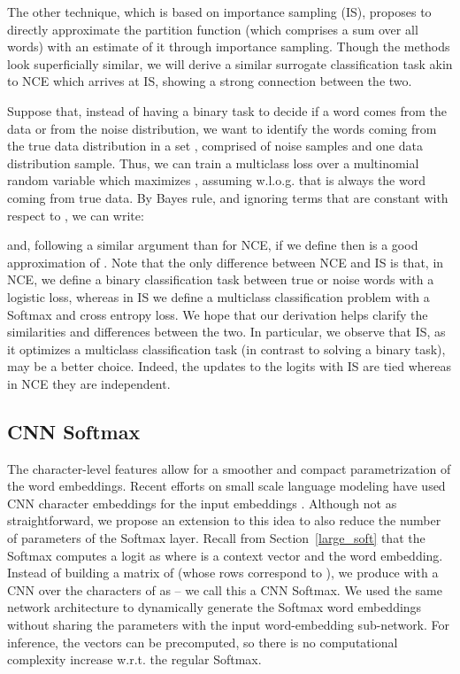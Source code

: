 \documentclass{article}
\begin{document}
The other technique, which is based on importance sampling (IS), proposes to directly approximate the partition function (which comprises a sum over all words) with an estimate of it through importance sampling. Though the methods look superficially similar, we will derive a similar surrogate classification task akin to NCE which arrives at IS, showing a strong connection between the two.

Suppose that, instead of having a binary task to decide if a word comes from the data or from the noise distribution, we want to identify the words coming from the true data distribution in a set , comprised of  noise samples and one data distribution sample. Thus, we can train a multiclass loss over a multinomial random variable  which maximizes , assuming w.l.o.g. that  is always the word coming from true data. By Bayes rule, and ignoring terms that are constant with respect to , we can write:


and, following a similar argument than for NCE, if we define  then  is a good approximation of . Note that the only difference between NCE and IS is that, in NCE, we define a binary classification task between true or noise words with a logistic loss, whereas in IS we define a multiclass classification problem with a Softmax and cross entropy loss. We hope that our derivation helps clarify the similarities and differences between the two. In particular, we observe that IS, as it optimizes a multiclass classification task (in contrast to solving a binary task), may be a better choice. Indeed, the updates to the logits with IS are tied whereas in NCE they are independent.

\subsection{CNN Softmax}
\label{cnn_softmax}

The character-level features allow for a smoother and compact parametrization of the word embeddings. Recent efforts on small scale language modeling have used CNN character embeddings for the input embeddings \cite{kim2015character}. Although not as straightforward, we propose an extension to this idea to also reduce the number of parameters of the Softmax layer. Recall from Section~\ref{large_soft} that the Softmax computes a logit as  where  is a context vector and  the word embedding. Instead of building a matrix of  (whose rows correspond to ), we produce  with a CNN over the characters of  as  -- we call this a CNN Softmax. We used the same network architecture to dynamically generate the Softmax word embeddings without sharing the parameters with the input word-embedding sub-network. For inference, the vectors  can be precomputed, so there is no computational complexity increase w.r.t. the regular Softmax.
\end{document}
